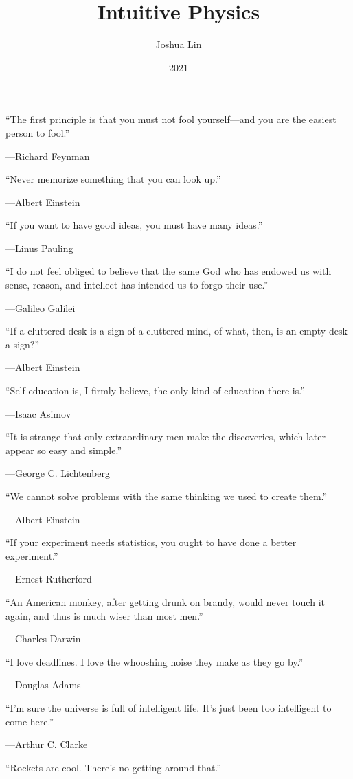 \documentclass{article}
\title{Intuitive Physics}
\author{Joshua Lin}
\date{2021}
\begin{document}
\maketitle
``The first principle is that you must not fool yourself---and you are the easiest person to fool.''

---Richard Feynman \bigskip

``Never memorize something that you can look up.''

---Albert Einstein \bigskip

``If you want to have good ideas, you must have many ideas.''

---Linus Pauling \bigskip

``I do not feel obliged to believe that the same God who has endowed us with sense, reason, and intellect has intended us to forgo their use.''

---Galileo Galilei \bigskip

``If a cluttered desk is a sign of a cluttered mind, of what, then, is an empty desk a sign?''

---Albert Einstein \bigskip

``Self-education is, I firmly believe, the only kind of education there is.''

---Isaac Asimov \bigskip

``It is strange that only extraordinary men make the discoveries, which later appear so easy and simple.''

---George C. Lichtenberg \bigskip

``We cannot solve problems with the same thinking we used to create them.''

---Albert Einstein \bigskip

``If your experiment needs statistics, you ought to have done a better experiment.''

---Ernest Rutherford \bigskip

``An American monkey, after getting drunk on brandy, would never touch it again, and thus is much wiser than most men.''

---Charles Darwin \bigskip

``I love deadlines. I love the whooshing noise they make as they go by.''

---Douglas Adams \bigskip

``I'm sure the universe is full of intelligent life. It's just been too intelligent to come here.''

---Arthur C. Clarke \bigskip

``Rockets are cool. There’s no getting around that.''
\end{document}
